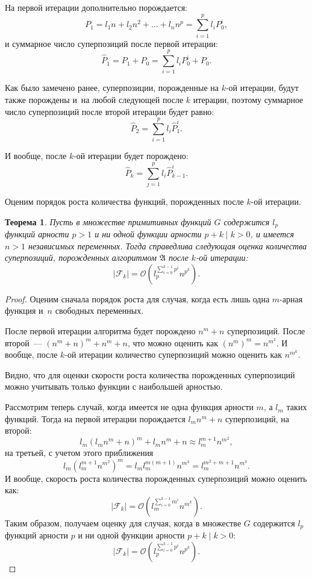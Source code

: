 \documentclass[12pt,a4paper]{article}
\newtheorem{theorem}{Теорема}
\begin{document}
На первой итерации дополнительно порождается:
\[
P_1 = l_1 n + l_2 n^2 + \dots + l_n n^p = \sum_{i=1}^p l_i P_0^i,
\]
и суммарное число суперпозиций после первой итерации:
\[
\hat{P}_1 = P_1 + P_0 = \sum_{i=1}^p l_i P_0^i + P_0.
\]

Как было замечено ранее, суперпозиции, порожденные на $k$-ой итерации, будут
также порождены и~на любой следующей после $k$ итерации, поэтому суммарное
число суперпозиций после второй итерации будет равно:
\[
\hat{P}_2 = \sum_{i=1}^p l_i \hat{P}_1^i.
\]

И вообще, после $k$-ой итерации будет порождено:
\[
\hat{P}_k = \sum_{j=1}^p l_i \hat{P}_{k-1}^i.
\]

Оценим порядок роста количества функций, порожденных после $k$-ой итерации.

\begin{theorem}
  Пусть в множестве примитивных функций $G$ содержится $l_p$ функций арности
  $p > 1$ и ни одной функции арности $p + k \mid k > 0$, и имеется $n > 1$
  независимых переменных. Тогда справедлива следующая оценка количества
  суперпозиций, порожденных алгоритмом $\mathfrak{A}$ после $k$-ой итерации:
  \[
  | \mathcal{F}_k | = \mathcal{O} (l_p^{\sum_{i=0}^{k-1} p^i} n^{p^k}).
  \]
\end{theorem}
\begin{proof}
  Оценим сначала порядок роста для случая, когда есть лишь одна $m$-арная
  функция и~$n$ свободных переменных.

  После первой итерации алгоритма будет порождено $n^m + n$ суперпозиций.
  После второй~--- $(n^m + n)^m + n^m + n$, что можно оценить как 
  $(n^m)^m = n^{m^2}$. И вообще, после $k$-ой итерации количество
  суперпозиций можно оценить как $n^{m^k}$.

  Видно, что для оценки скорости роста количества порожденных суперпозиций
  можно учитывать только функции с наибольшей арностью.

  Рассмотрим теперь случай, когда имеется не одна функция арности $m$, а
  $l_m$ таких функций. Тогда на первой итерации порождается $l_m n^m + n$
  суперпозиций, на второй:
  \[
  l_m (l_m n^m + n)^m + l_m n^m + n \approx l_m^{m+1} n^{m^2},
  \]
  на третьей, с учетом этого приближения
  \[
  l_m (l_m^{m+1} n^{m^2})^m = l_m l_m^{m(m+1)} n^{m^3} = l_m^{m^2 + m + 1} n^{m^3}.
  \]
  И вообще, скорость роста количества порожденных суперпозиций можно оценить
  как:
  \[
  | \mathcal{F}_k | = \mathcal{O} (l_m^{\sum_{i=0}^{k-1} m^i} n^{m^k}).
  \]
  Таким образом, получаем оценку для случая, когда в множестве $G$ содержится
  $l_p$ функций арности $p$ и ни одной функции арности $p + k \mid k > 0$:
  \[
  | \mathcal{F}_k | = \mathcal{O} (l_p^{\sum_{i=0}^{k-1} p^i} n^{p^k}).
  \]
\end{proof}
\end{document}

